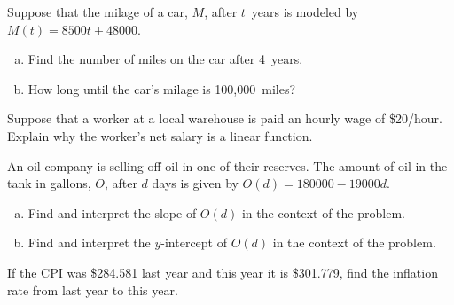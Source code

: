 \documentclass[12pt,letterpaper]{exam}
\begin{document}
\examtitle
{} 
\scores
\newpage

\begin{questions}

\newpage
\question[10] Suppose that the milage of a car, $M$, after $t$~years is modeled by $M(t)= 8500t + 48000$. 
	\begin{enumerate}[(a)]
	\item Find the number of miles on the car after 4~years.
	\item How long until the car's milage is 100,000~miles?
	\end{enumerate}



\newpage
\question[10] Suppose that a worker at a local warehouse is paid an hourly wage of \$20/hour. Explain why the worker's net salary is a linear function. 



\newpage
\question[10] An oil company is selling off oil in one of their reserves. The amount of oil in the tank in gallons, $O$, after $d$ days is given by $O(d)= 180000 - 19000d$.
	\begin{enumerate}[(a)]
	\item Find and interpret the slope of $O(d)$ in the context of the problem. 
	\item Find and interpret the $y$-intercept of $O(d)$ in the context of the problem. 
	\end{enumerate}



\newpage
\question[10] If the CPI was \$284.581 last year and this year it is \$301.779, find the inflation rate from last year to this year. 




\end{questions}
\end{document}
